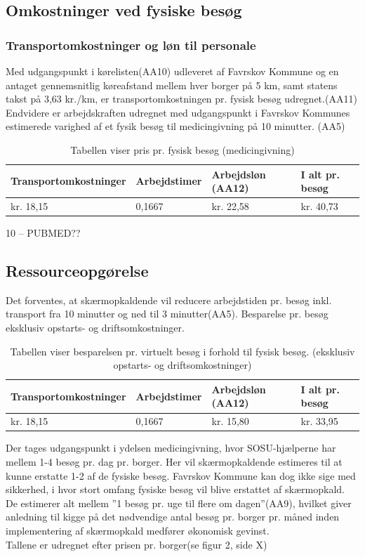 \subsection{Omkostninger ved fysiske besøg}
\subsubsection{Transportomkostninger og løn til personale}
Med udgangspunkt i kørelisten(AA10) udleveret af Favrskov Kommune og en antaget gennemsnitlig køreafstand mellem hver borger på 5 km, samt statens takst på 3,63 kr./km, er transportomkostningen pr. fysisk besøg udregnet.(AA11)
Endvidere er arbejdskraften udregnet med udgangspunkt i Favrskov Kommunes estimerede varighed af et fysik besøg til medicingivning på 10 minutter. (AA5)

\begin{table}[H]
	\caption{Tabellen viser pris pr. fysisk besøg (medicingivning)}
	\centering
	\label{tab:tabelfysiskbes}
	\begin{tabular}{|l|l|l|l|}
		\hline
		\textbf{Transportomkostninger} & \textbf{Arbejdstimer } & \textbf{Arbejdsløn (AA12)} & \textbf{I alt pr. besøg}\\ \hline
		kr. 18,15 & 0,1667 & kr. 22,58 & kr. 40,73\\ \hline
	\end{tabular}
\end{table}

10 – PUBMED??

\subsection{Ressourceopgørelse}
Det forventes, at skærmopkaldende vil reducere arbejdstiden pr. besøg inkl. transport fra 10 minutter og ned til 3 minutter(AA5).  
Besparelse pr. besøg eksklusiv opstarts- og driftsomkostninger.

\begin{table}[H]
	\caption{Tabellen viser besparelsen pr. virtuelt besøg i forhold til fysisk besøg. (eksklusiv opstarts- og driftsomkostninger)}
	\centering
	\label{tab:tabelbesparelse}
	\begin{tabular}{|l|l|l|l|}
		\hline
		\textbf{Transportomkostninger} & \textbf{Arbejdstimer } & \textbf{Arbejdsløn (AA12)} & \textbf{I alt pr. besøg}\\ \hline
		kr. 18,15 & 0,1667 & kr. 15,80 & kr. 33,95\\ \hline
	\end{tabular}
\end{table}
Der tages udgangspunkt i ydelsen medicingivning, hvor SOSU-hjælperne har mellem 1-4 besøg pr. dag pr. borger. Her vil skærmopkaldende estimeres til at kunne erstatte 1-2 af de fysiske besøg. Favrskov Kommune kan dog ikke sige med sikkerhed, i hvor stort omfang fysiske besøg vil blive erstattet af skærmopkald.\\
De estimerer alt mellem ”1 besøg pr. uge til flere om dagen”(AA9), hvilket giver anledning til kigge på det nødvendige antal besøg pr. borger pr. måned inden implementering af skærmopkald medfører økonomisk gevinst.\\
Tallene er udregnet efter prisen pr. borger(se figur 2, side X)

